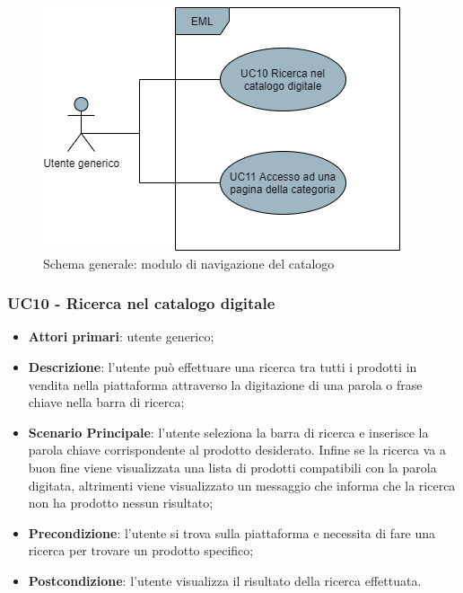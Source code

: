 \begin{figure}[H]
\centering
\includegraphics[scale=0.6]{res/UseCase/Immagini/NavigazioneCatalogoGenerale}
\caption{Schema generale: modulo di navigazione del catalogo}
\end{figure}
\subsubsection{UC10 - Ricerca nel catalogo digitale}
\begin{itemize}
\item \textbf{Attori primari}: utente generico;
\item \textbf{Descrizione}: l'utente può effettuare una ricerca tra tutti i prodotti in vendita nella piattaforma attraverso la digitazione di una parola o frase chiave nella barra di ricerca;
\item \textbf{Scenario Principale}: l'utente seleziona la barra di ricerca e inserisce la parola chiave corrispondente al prodotto desiderato. Infine se la ricerca va a buon fine viene visualizzata una lista di prodotti compatibili con la parola digitata, altrimenti viene visualizzato un messaggio che informa che la ricerca non ha prodotto nessun risultato;
\item \textbf{Precondizione}: l'utente si trova sulla piattaforma e necessita di fare una ricerca per trovare un prodotto specifico;
\item \textbf{Postcondizione}: l'utente visualizza il risultato della ricerca effettuata.
\end{itemize}
